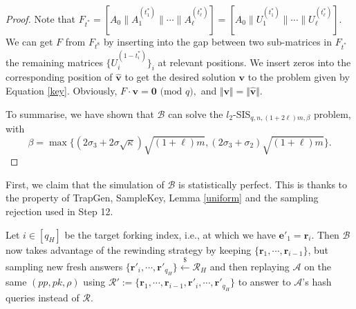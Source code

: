 \documentclass[runningheads]{llncs}
\def\cal{\mathcal}
\def\bf{\mathbf}
\begin{document}
\begin{proof}
Note that $F_{t^*}= \left[ A_0 \|A_1^{(t^*_1)}\| \cdots \|A_\ell^{(t^*_\ell)} \right]=\left[ A_0 \|U_1^{(t^*_1)}\| \cdots \|U_\ell^{(t^*_\ell)} \right]$. 
We can get $F$ from $F_{t^8}$ by inserting into the gap between 
two sub-matrices in $F_{t^*}$ the remaining matrices $\{U_i^{(1-t^*_i)} \}_i$ at relevant positions. 
We insert zeros into the corresponding position of $\widehat{\bf{v}}$ 
to get the desired solution $\bf{v}$ to the problem given by Equation \eqref{key}. 
Obviously, $F\cdot \bf{v} = \textbf{0} \text{ (mod } q),$ and $\Vert \bf{v} \Vert=\Vert \widehat{\bf{v}} \Vert$. 

To summarise, we have shown that 
$\mathcal{B}$ can solve the $l_2$-\textsf{SIS}$_{q,n,(1+2\ell)m, \beta}$ 
problem, with $$\beta=\max\{ (2\sigma_3+2\sigma\sqrt{\kappa})\sqrt{(1+\ell)m}, (2\sigma_3+\sigma_2)\sqrt{(1+\ell)m}\}.$$
\end{proof}

\iffalse

First, we claim that the simulation of $\cal{B}$  is  statistically perfect. This is thanks to the property of \textsf{TrapGen}, \textsf{SampleKey}, Lemma \ref{uniform} and the sampling rejection used in Step 12.
\iffalse
Indeed, the simulation looks  as same as the real game except that: (i) some matrices $A^{(b)}_i$ is not really random but is generated by \textsf{TrapGen}, (ii) the matrix $K$ is not randomly chosen, but obtained by sampling  $S^*$ from $\cal{D}_\sigma^{(1+\ell)m\times m}$ then assigning $K:=F\cdot S^*$, and (iii) the matrix $S_{t^*}$ is $S^*$ which is not computed using \textsf{SampleKey}.  However, for (i): Theorem \ref{thm:TrapGen} ensures that the distribution of $A^{(b)}_i$'s which are generated by \textsf{TrapGen}  is close to uniform distribution. Further, for (ii): Lemma \ref{uniform} shows that $K$ is close to uniform as pointed above. Note that, we will see that the sufficiently large choice of $\sigma$ does not affect (iii). In fact, for (iii), the forger $\cal{A}$ does not know about $S_t$, hence $S^*$. Additionally, by the way of outputting $\bf{z}$ (in Step 12) using the rejection sampling, we always guarantee that $\bf{z}\leftarrow \cal{D}_{\sigma_2}^{(\ell+1)m}$ and $\bf{z}$ is independent of $S_t$, hence $S^*$, then the view of $\cal{A}$ is independent of $S^*$.

\fi
Let $i \in [q_H]$ be the target forking index, i.e., at which we have $\mathbf{e}'_1=\mathbf{r}_i$. Then $\mathcal{B}$ now takes advantage of the rewinding strategy by keeping $\{\mathbf{r}_{1}, \cdots, \mathbf{r}_{i-1}\}$, but sampling new fresh answers $\{\mathbf{r}'_{i}, \cdots, \mathbf{r}'_{q_H}\} \xleftarrow{\$} \cal{R}_H$ and then replaying $\mathcal{A}$ on  the same $(pp,pk,\rho)$ using $\mathcal{R}':=\{\mathbf{r}_1, \cdots, \mathbf{r}_{i-1}, \mathbf{r}'_{i}, \cdots, \mathbf{r}'_{q_H} \}$ to answer to $\cal{A}$'s hash queries instead of $\mathcal{R}$. 
\end{document}
